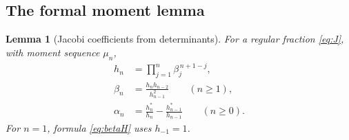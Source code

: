 \documentclass[11pt,letterpaper]{article}
\numberwithin{equation}{section}
\newtheorem{lemma}[theorem]{Lemma}
\theoremstyle{definition}
\theoremstyle{remark}
\begin{document}
\subsection{The formal moment lemma}
\begin{lemma}[Jacobi coefficients from determinants]\label{lem:hankel}
For a regular fraction \eqref{eq:J}, with moment sequence $\mu_n$,
\begin{align}
 h_n&=\prod_{j=1}^{n}\beta_j^{\,n+1-j},\label{eq:hproduct}\\
 \beta_n&=\frac{h_nh_{n-2}}{h_{n-1}^2}\qquad(n\ge1),\label{eq:betaH}\\
 \alpha_n&=\frac{h_n^*}{h_n}-\frac{h_{n-1}^*}{h_{n-1}}
                 \qquad(n\ge0).\label{eq:alphaH}
\end{align}
For $n=1$, formula \eqref{eq:betaH} uses $h_{-1}=1$.
\end{lemma}
\end{document}
